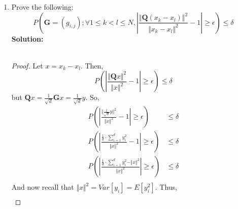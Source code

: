\documentclass[11pt]{article}
\begin{document}
\begin{enumerate}
\begin{proof}
\begin{equation*}
	\end{equation*}
	where the alphas cancel. Also note that in small deviation regime, $\frac{\epsilon}{\beta} < 1$ which implies that if you square it, it will become even smaller. Thus, $\frac{\epsilon^2}{\beta^2}$ is the minimum. And so,
	\begin{align*}
		P \left( \left| \frac{1}{d} \sum_{i=1}^d z_i \right| \ge \epsilon \right) &\le \exp 2 \left(-1 \cdot \frac{\epsilon^2}{\beta^2} \frac{2\beta^2}{\epsilon^2}\log\left(N/\sqrt{\delta}\right) \right) \\
		&= 2 \exp \left( -2 \log \left( N/\sqrt{\delta}\right)\right) \\
		&= 2 \exp \left[ \log \left( N/\sqrt{\delta}\right)^{-2} \right] \\
		&= 2 \left( \frac{N}{\sqrt{\delta}} \right)^{-2} \\
		&= \frac{2 \delta}{N^2}
	\end{align*}
	\end{proof}
	\item Prove the following:
	\begin{equation*}
		P \left( \textbf{G} = (g_{i,j}); \forall 1 \le k < l \le N, \left| \frac{\Vert \textbf{Q}(x_k - x_l) \Vert^2}{\Vert x_k - x_l \Vert^2} - 1 \right| \ge \epsilon \right) \le \delta
	\end{equation*}
	\textbf{Solution:} \\\\
	\begin{proof}
	Let $x = x_k - x_l$. Then,
	\begin{equation*}
		P \left(\left| \frac{\Vert \textbf{Q}x \Vert^2}{\Vert x \Vert^2} - 1 \right| \ge \epsilon \right) \le \delta
	\end{equation*}
	but $\textbf{Q}x = \frac{1}{\sqrt{d}}\textbf{G}x = \frac{1}{\sqrt{d}}y$. So,
	\begin{align*}
		P \left(\left| \frac{\Vert \frac{1}{\sqrt{d}}y \Vert^2}{\Vert x \Vert^2} - 1 \right| \ge \epsilon \right) &\le \delta \\
		P \left(\left| \frac{\frac{1}{d} \cdot \sum_{i=1}^d y_i^2}{\Vert x \Vert^2} - 1 \right| \ge \epsilon \right) &\le \delta \\
		P \left(\left| \frac{\frac{1}{d} \cdot \sum_{i=1}^d y_i^2 - \Vert x \Vert^2}{\Vert x \Vert^2} \right| \ge \epsilon \right) &\le \delta \\
	\end{align*}
	And now recall that $\Vert x \Vert^2 = Var[y_i] = E[y_i^2]$. Thus,
	\begin{align*}

\end{align*}
\end{proof}
\end{enumerate}
\end{document}
